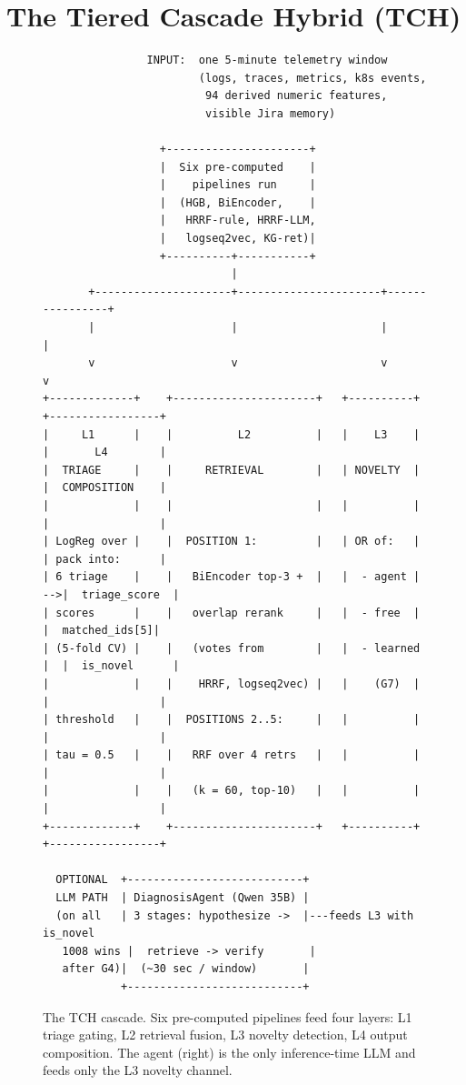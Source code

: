 \section{The Tiered Cascade Hybrid (TCH)}
\label{sec:tch}

\begin{figure}[t]
\centering
\begin{minipage}{0.93\linewidth}
\small
\begin{verbatim}
                INPUT:  one 5-minute telemetry window
                        (logs, traces, metrics, k8s events,
                         94 derived numeric features,
                         visible Jira memory)

                  +----------------------+
                  |  Six pre-computed    |
                  |    pipelines run     |
                  |  (HGB, BiEncoder,    |
                  |   HRRF-rule, HRRF-LLM,
                  |   logseq2vec, KG-ret)|
                  +----------+-----------+
                             |
       +---------------------+----------------------+----------------+
       |                     |                      |                |
       v                     v                      v                v
+-------------+    +----------------------+   +----------+   +-----------------+
|     L1      |    |          L2          |   |    L3    |   |       L4        |
|  TRIAGE     |    |     RETRIEVAL        |   | NOVELTY  |   |  COMPOSITION    |
|             |    |                      |   |          |   |                 |
| LogReg over |    |  POSITION 1:         |   | OR of:   |   | pack into:      |
| 6 triage    |    |   BiEncoder top-3 +  |   |  - agent | -->|  triage_score  |
| scores      |    |   overlap rerank     |   |  - free  |   |  matched_ids[5]|
| (5-fold CV) |    |   (votes from        |   |  - learned |  |  is_novel      |
|             |    |    HRRF, logseq2vec) |   |    (G7)  |   |                 |
| threshold   |    |  POSITIONS 2..5:     |   |          |   |                 |
| tau = 0.5   |    |   RRF over 4 retrs   |   |          |   |                 |
|             |    |   (k = 60, top-10)   |   |          |   |                 |
+-------------+    +----------------------+   +----------+   +-----------------+

  OPTIONAL  +---------------------------+
  LLM PATH  | DiagnosisAgent (Qwen 35B) |
  (on all   | 3 stages: hypothesize ->  |---feeds L3 with is_novel
   1008 wins |  retrieve -> verify       |
   after G4)|  (~30 sec / window)       |
            +---------------------------+
\end{verbatim}
\end{minipage}
\caption{The TCH cascade. Six pre-computed pipelines feed four layers: L1 triage gating, L2 retrieval fusion, L3 novelty detection, L4 output composition. The agent (right) is the only inference-time LLM and feeds only the L3 novelty channel.}
\label{fig:tch-arch}
\end{figure}

